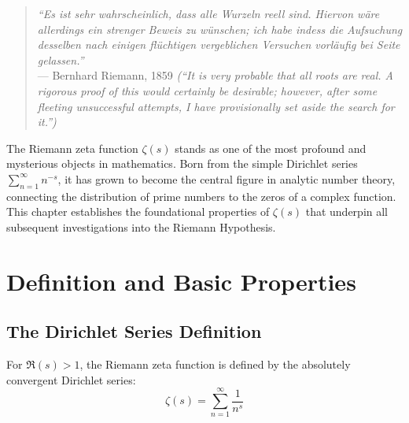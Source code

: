 

\begin{quote}
\textit{``Es ist sehr wahrscheinlich, dass alle Wurzeln reell sind. Hiervon wäre allerdings ein strenger Beweis zu wünschen; ich habe indess die Aufsuchung desselben nach einigen flüchtigen vergeblichen Versuchen vorläufig bei Seite gelassen.''} \\
--- Bernhard Riemann, 1859 \cite{riemann1859} \textit{(``It is very probable that all roots are real. A rigorous proof of this would certainly be desirable; however, after some fleeting unsuccessful attempts, I have provisionally set aside the search for it.'')}
\end{quote}

The Riemann zeta function $\zeta(s)$ stands as one of the most profound and mysterious objects in mathematics. Born from the simple Dirichlet series $\sum_{n=1}^{\infty} n^{-s}$, it has grown to become the central figure in analytic number theory, connecting the distribution of prime numbers to the zeros of a complex function. This chapter establishes the foundational properties of $\zeta(s)$ that underpin all subsequent investigations into the Riemann Hypothesis.

\section{Definition and Basic Properties}
\label{sec:definition_basic}

\subsection{The Dirichlet Series Definition}

\begin{definition}
\label{def:zeta_original}
For $\Re(s) > 1$, the Riemann zeta function is defined by the absolutely convergent Dirichlet series:
\begin{equation}
\zeta(s) = \sum_{n=1}^{\infty} \frac{1}{n^s}
\label{eq:zeta_dirichlet}
\end{equation}
\end{definition}

